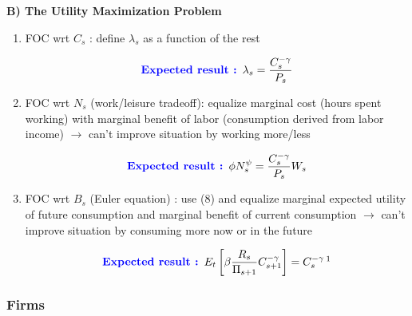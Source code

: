 \documentclass{article}
\begin{document}
\textbf{B) The Utility Maximization Problem}
\begin{enumerate}
    \item FOC wrt $C_s$ : define $\lambda_s$ as a function of the rest
    \begin{expectedresultsbox}
    \begin{equation}
        \textcolor{blue}{\textbf{Expected result : }} \lambda_s = \frac{C_s^{-\gamma}}{P_s}
    \end{equation}
    \end{expectedresultsbox}
    \item FOC wrt $N_s$ (work/leisure tradeoff): equalize marginal cost (hours spent working) with marginal benefit of labor (consumption derived from labor income) $\xrightarrow{}$ can't improve situation by working more/less
    \begin{expectedresultsbox}
    \begin{equation}
        \textcolor{blue}{\textbf{Expected result : }} \phi N_s^{\psi}  = \frac{C_s^{-\gamma}}{P_s}W_s
    \end{equation}
    \end{expectedresultsbox}
    \item FOC wrt $B_s$ (Euler equation) : use (8) and equalize marginal expected utility of future consumption and marginal benefit of current consumption $\xrightarrow{}$ can't improve situation by consuming more now or in the future
    \begin{expectedresultsbox}
    \begin{equation}
        \textcolor{blue}{\textbf{Expected result : }} E_t\left[\beta\frac{R_s}{\Pi_{s+1}}C_{s+1}^{-\gamma}\right] = C_s^{-\gamma}\,\footnotemark
    \end{equation}
    \end{expectedresultsbox}
\end{enumerate}


\subsubsection{Firms}
\end{document}
